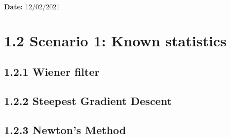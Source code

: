 \documentclass[12pt]{article}
\renewcommand{\_}{\kern-1.5pt\textunderscore\kern-1.5pt}
\begin{document}
\textbf{Date: }12/02/2021\par

\newpage
\section*{1.2   Scenario 1: Known statistics}
\subsection*{1.2.1  Wiener filter}
\subsubsection{}
\subsubsection{}
\subsubsection{}
\subsection*{1.2.2  Steepest Gradient Descent}
\setcounter{subsubsection}{3} 
\subsubsection{}
\subsubsection{}
\subsubsection{}
\subsection*{1.2.3  Newton's Method}
\setcounter{subsubsection}{6} 
\subsubsection{}
\subsubsection{}
\subsubsection{}
\end{document}
